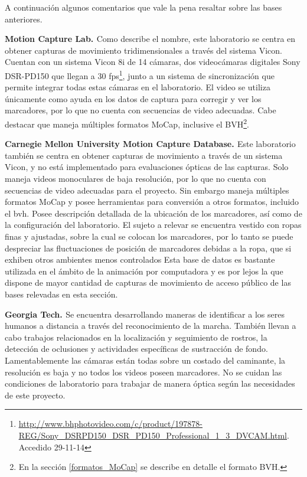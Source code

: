 A continuación algunos comentarios que vale la pena resaltar sobre  las bases anteriores.

\textbf{Motion Capture Lab. \cite{MCL}} %
		Como describe el nombre, este laboratorio se centra en obtener capturas de movimiento tridimensionales a través del sistema Vicon. Cuentan con un sistema Vicon 8i de 14 cámaras, dos videocámaras digitales Sony DSR-PD150 que llegan a 30 fps\footnote{\textcolor{blue}{{\scriptsize\underline{\url{http://www.bhphotovideo.com/c/product/197878-REG/Sony_DSRPD150_DSR_PD150_Professional_1_3_DVCAM.html}}}}. Accedido 29-11-14 }, junto a un sistema de sincronización que permite integrar todas estas cámaras en el laboratorio. El video se utiliza únicamente como ayuda en los datos de captura para corregir y ver los marcadores,  por lo que no cuenta con secuencias de video adecuadas. Cabe destacar que maneja múltiples formatos MoCap, inclusive el BVH\footnote{En la sección \ref{formatos_MoCap} se describe en detalle el formato BVH.}.

\textbf{Carnegie Mellon University Motion Capture Database. \cite{CMU}} \label{CMU}
 Este laboratorio también se centra en obtener capturas de movimiento a través de un sistema Vicon, y no está implementado para evaluaciones ópticas de las capturas. Solo maneja videos monoculares de baja resolución, por lo que no cuenta con secuencias de video adecuadas para el proyecto. Sin embargo maneja múltiples formatos MoCap y  posee herramientas para conversión a otros formatos, incluido el bvh. Posee descripción detallada de la ubicación de los marcadores, así como de la configuración del laboratorio. El sujeto a relevar se encuentra vestido con ropas finas y ajustadas, sobre la cual se colocan los marcadores, por lo tanto se puede despreciar las fluctuaciones de posición de marcadores debidas a la ropa, que si exhiben otros ambientes menos controlados  Esta base de datos es bastante utilizada en el ámbito de la  animación por computadora y es por lejos la que dispone de mayor cantidad de capturas de movimiento de acceso público de las bases relevadas en esta sección.

\textbf{Georgia Tech. \cite{GT} }
Se encuentra desarrollando maneras de identificar a los seres humanos a distancia a través del reconocimiento de la marcha. También llevan a cabo trabajos relacionados en la localización y seguimiento de rostros, la detección de oclusiones y actividades específicas de sustracción de fondo.
Lamentablemente las cámaras están todas sobre un costado del caminante, la resolución es baja y no todos los videos poseen marcadores. No se cuidan las condiciones de laboratorio para trabajar de manera óptica según las necesidades de este proyecto.


